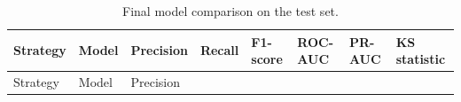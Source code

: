 \documentclass[
  12pt,
  letterpaper,
]{book}
\begin{document}
\begin{longtable}[]{@{}
  >{\centering\arraybackslash}p{}
  >{\centering\arraybackslash}p{}
  >{\centering\arraybackslash}p{}
  >{\centering\arraybackslash}p{}
  >{\centering\arraybackslash}p{}
  >{\centering\arraybackslash}p{}
  >{\centering\arraybackslash}p{}
  >{\centering\arraybackslash}p{}@{}}
\caption{Final model comparison on the test
set.}\label{tbl-final-model-comparison}\tabularnewline
\toprule\noalign{}
\begin{minipage}[b]{\linewidth}\centering
Strategy
\end{minipage} & \begin{minipage}[b]{\linewidth}\centering
Model
\end{minipage} & \begin{minipage}[b]{\linewidth}\centering
Precision
\end{minipage} & \begin{minipage}[b]{\linewidth}\centering
Recall
\end{minipage} & \begin{minipage}[b]{\linewidth}\centering
F1-score
\end{minipage} & \begin{minipage}[b]{\linewidth}\centering
ROC-AUC
\end{minipage} & \begin{minipage}[b]{\linewidth}\centering
PR-AUC
\end{minipage} & \begin{minipage}[b]{\linewidth}\centering
KS statistic
\end{minipage} \\
\midrule\noalign{}
\endfirsthead
\toprule\noalign{}
\begin{minipage}[b]{\linewidth}\centering
Strategy
\end{minipage} & \begin{minipage}[b]{\linewidth}\centering
Model
\end{minipage} & \begin{minipage}[b]{\linewidth}\centering
Precision
\end{minipage} & \begin{minipage}[b]{\linewidth}\centering

\end{minipage}
\end{longtable}
\end{document}
